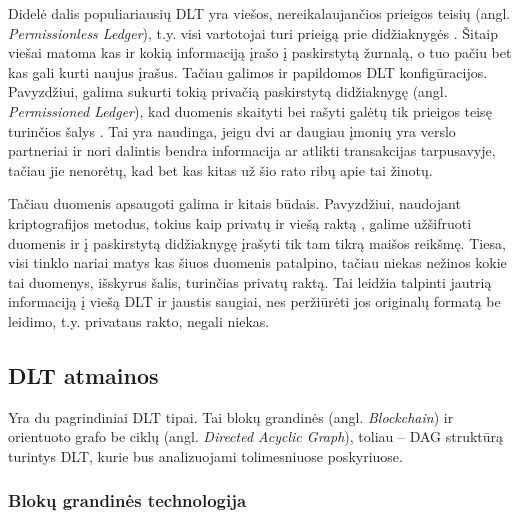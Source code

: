 Didelė dalis populiariausių DLT yra viešos, nereikalaujančios prieigos teisių (angl. \textit{Permissionless Ledger}), t.y. visi vartotojai turi prieigą prie didžiaknygės \cite{olnes2017blockchain}. Šitaip viešai matoma kas ir kokią informaciją įrašo į paskirstytą žurnalą, o tuo pačiu bet kas gali kurti naujus įrašus. Tačiau galimos ir papildomos DLT konfigūracijos. Pavyzdžiui, galima sukurti tokią privačią paskirstytą didžiaknygę (angl. \textit{Permissioned Ledger}), kad duomenis skaityti bei rašyti galėtų tik prieigos teisę turinčios šalys \cite{backlund2016technical}. Tai yra naudinga, jeigu dvi ar daugiau įmonių yra verslo partneriai ir nori dalintis bendra informacija ar atlikti transakcijas tarpusavyje, tačiau jie nenorėtų, kad bet kas kitas už šio rato ribų apie tai žinotų. 

Tačiau duomenis apsaugoti galima ir kitais būdais. Pavyzdžiui, naudojant kriptografijos metodus, tokius kaip privatų ir viešą raktą \cite{zyskind2015decentralizing}, galime užšifruoti duomenis ir į paskirstytą didžiaknygę įrašyti tik tam tikrą maišos reikšmę. Tiesa, visi tinklo nariai matys kas šiuos duomenis patalpino, tačiau niekas nežinos kokie tai duomenys, išskyrus šalis, turinčias privatų raktą. Tai leidžia talpinti jautrią informaciją į viešą DLT ir jaustis saugiai, nes peržiūrėti jos originalų formatą be leidimo, t.y. privataus rakto, negali niekas.




\subsection{DLT atmainos}

Yra du pagrindiniai DLT tipai. Tai blokų grandinės (angl. \textit{Blockchain}) ir orientuoto grafo be ciklų (angl. \textit{Directed Acyclic Graph}), toliau – DAG struktūrą turintys DLT, kurie bus analizuojami tolimesniuose poskyriuose.




\subsubsection{Blokų grandinės technologija}

